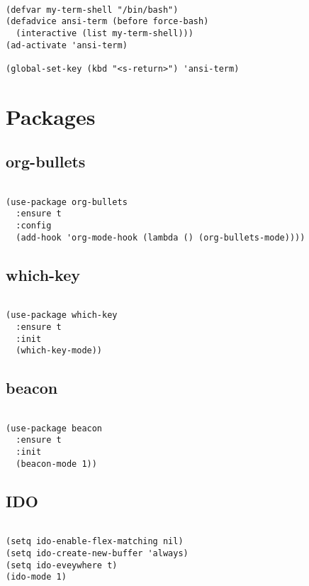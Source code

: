 \documentclass[11pt]{article}
\begin{document}
\begin{verbatim}

(defvar my-term-shell "/bin/bash")
(defadvice ansi-term (before force-bash)
  (interactive (list my-term-shell)))
(ad-activate 'ansi-term)

(global-set-key (kbd "<s-return>") 'ansi-term)

\end{verbatim}

\section{Packages}
\label{sec:orgebc3c48}
\subsection{org-bullets}
\label{sec:org860f136}
\begin{verbatim}

(use-package org-bullets
  :ensure t
  :config
  (add-hook 'org-mode-hook (lambda () (org-bullets-mode))))

\end{verbatim}
\subsection{which-key}
\label{sec:orgf815586}
\begin{verbatim}

(use-package which-key
  :ensure t
  :init
  (which-key-mode))

\end{verbatim}

\subsection{beacon}
\label{sec:org508af00}

\begin{verbatim}

(use-package beacon
  :ensure t
  :init
  (beacon-mode 1))

\end{verbatim}
\subsection{IDO}
\label{sec:org94ce1f5}

\begin{verbatim}

(setq ido-enable-flex-matching nil)
(setq ido-create-new-buffer 'always)
(setq ido-eveywhere t)
(ido-mode 1)

\end{verbatim}
\end{document}
